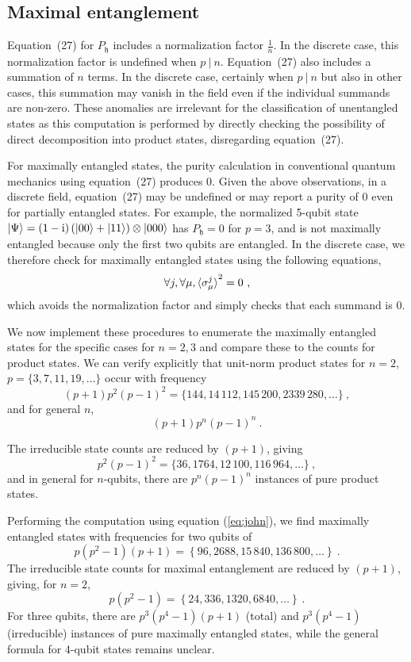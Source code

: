 \documentclass[12pt]{iopart}
\def\fh{\mathfrak{h}}
\begin{document}
\subsection{Maximal entanglement}

Equation~(27) for $P_{\fh}$ includes a normalization factor $\frac{1}{n}$. In the discrete case, this normalization factor is undefined when $p ~|~ n$. Equation~(27) also includes a summation of $n$ terms. In the discrete case, certainly when $p ~|~ n$ but also in other cases, this summation may vanish in the field even if the individual summands are non-zero. These anomalies are irrelevant for the classification of unentangled states as this computation is performed by directly checking the possibility of direct decomposition into product states, disregarding equation~(27). 

For maximally entangled states, the purity calculation in conventional quantum mechanics using equation~(27) produces 0. Given the above observations, in a discrete field, equation~(27) may be undefined or may report a purity of 0 even for partially entangled states. For example, the normalized 5-qubit state $\ket{\Psi}=\left(1-\mathrm{i}\right)\left(\ket{00}+\ket{11}\right)\otimes\ket{000}$ has $P_{\fh}=0$ for $p=3$, and is not maximally entangled because only the first two qubits are entangled. In the discrete case, we therefore check for maximally entangled states using the following equations,
\begin{equation}
\forall j,\forall\mu,\braket{\sigma_{\mu}^{j}}^2 =0\textrm{ ,}\label{eq:john}
\end{equation}
which avoids the normalization factor and simply checks that each summand is 0. 

We now implement these procedures to enumerate the maximally entangled states for the specific cases for $n = 2 ,3 $ and compare these to the counts for product states. We can verify explicitly that unit-norm product states for $n=2$,
$p=\{3,7,11,19,\ldots\}$ occur with frequency 
\[
(p+1)p^{2}(p-1)^{2}=\{144,14\,112,145\,200,2339\,280,\ldots\}\ ,
\]
and for general $n$, \[(p+1)p^{n}(p-1)^{n}\ .\]

The irreducible state counts are reduced by $(p+1)$, giving 
\[
p^{2}(p-1)^{2}=\{36,1764,12\,100,116\,964,\ldots\}\ ,
\]
and in general for $n$-qubits, there are $p^{n}\left(p-1\right)^{n}$
instances of pure product states.

Performing the computation using equation (\ref{eq:john}), we find maximally entangled states with
frequencies for two qubits of 
\[
p\left(p^2-1\right)\left(p+1\right)=\left\{ 96,2688,15\,840,136\,800,\ldots\right\} \ .
\]
The irreducible state counts for maximal entanglement are reduced
by $\left(p+1\right)$, giving, for $n=2$, 
\[
p\left(p^{2}-1\right)=\left\{ 24,336,1320,6840,\ldots\right\} \ .
\]
For three qubits, there are $p^{3}\left(p^{4}-1\right)\left(p+1\right)$ (total) and $p^{3}\left(p^{4}-1\right)$ (irreducible) instances of pure maximally entangled states, while the general formula for 4-qubit states remains unclear.
\end{document}
